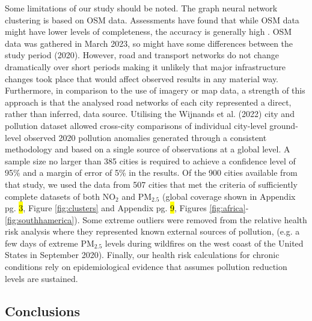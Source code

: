 \documentclass[preprint,10pt]{elsarticle} %
\begin{document}
Some limitations of our study should be noted. The graph neural network clustering is based on OSM data. Assessments have found that while OSM data might have lower levels of completeness, the accuracy is generally high \cite{Zhou2022c,Zhou2022d}. OSM data was gathered in March 2023, so might have some differences between the study period (2020). However, road and transport networks do not change dramatically over short periods \cite{Taillanter2023} making it unlikely that major infrastructure changes took place that would affect observed results in any material way. Furthermore, in comparison to the use of imagery or map data, a strength of this approach is that the analysed road networks of each city represented a direct, rather than inferred, data source. Utilising the Wijnands et al. (2022)\cite{Wijnands2022} city and pollution dataset allowed cross-city comparisons of individual city-level ground-level observed 2020 pollution anomalies generated through a consistent methodology and based on a single source of observations at a global level. A sample size no larger than 385 cities is required to achieve a confidence level of 95\% and a margin of error of 5\% in the results. Of the 900 cities available from that study, we used the data from 507 cities that met the criteria of sufficiently complete datasets of both NO$_{2}$ and PM$_{2.5}$ (global coverage shown in Appendix pg. \hl{3}, Figure \ref{fig:clusters} and Appendix pg. \hl{9}, Figures \ref{fig:africa}-\ref{fig:southhamerica}). Some extreme outliers were removed from the relative health risk analysis where they represented known external sources of pollution, (e.g. a few days of extreme PM$_{2.5}$ levels during wildfires on the west coast of the United States in September 2020). Finally, our health risk calculations for chronic conditions rely on epidemiological evidence that assumes pollution reduction levels are sustained.

\subsection*{Conclusions}
\end{document}
